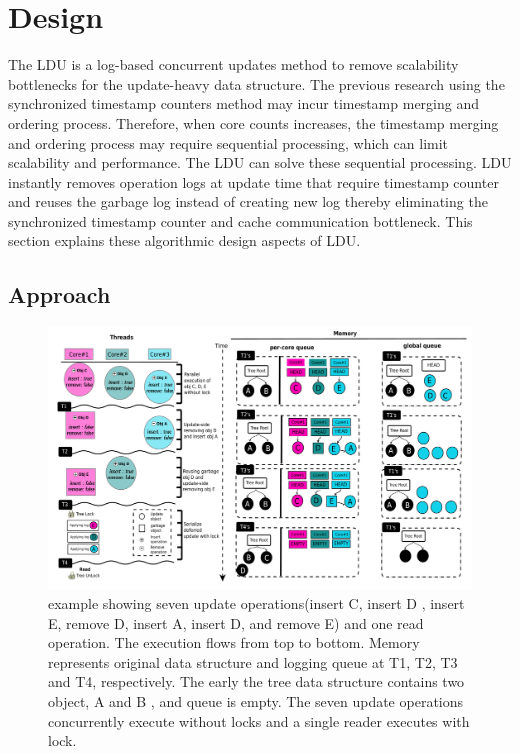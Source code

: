 \section{Design}


The LDU is a log-based concurrent updates method to remove scalability
bottlenecks for the update-heavy data structure.
The previous research using the synchronized timestamp counters method may incur
timestamp merging and ordering process.
Therefore, when core counts increases, the timestamp merging and ordering
process may require sequential processing, which can limit scalability and
performance.
The LDU can solve these sequential processing.
LDU instantly removes operation logs at update time that require timestamp
counter and reuses the garbage log instead of creating new log
thereby eliminating the synchronized timestamp counter and cache communication
bottleneck.
This section explains these algorithmic design aspects of LDU.

\subsection{Approach}

\begin{figure}[tb]
  \begin{center}
     \includegraphics[width=1.0\textwidth,height=0.4\textheight]{fig/basic_gldu}
  \end{center}
  \caption{ example showing seven update operations(insert C, insert D ,
  insert E, remove D, insert A, insert D, and remove E) and one read
  operation. The execution flows from top to bottom.
  Memory represents original data structure and logging queue at T1, T2, T3 and T4, respectively. The early
  the tree data structure contains two object, A and B , and queue is empty.
  The seven update operations concurrently execute without locks and a single
  reader executes with lock.}
  \label{fig:basic}
\end{figure}

